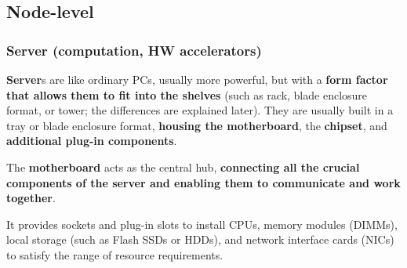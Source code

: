 \documentclass[a4paper]{article}
\newcommand{\definition}[1]{\textcolor{Red3}{\textbf{#1}}\index{#1}}
\newcommand{\highspace}{\vspace{1.2em}\noindent}
\begin{document}
    \newpage

    \subsection{Node-level}

    \subsubsection{Server (computation, HW accelerators)}\label{subsubsection: Server (computation, HW accelerators)}

    \definition{Server}s are like ordinary PCs, usually more powerful, but with a \textbf{form factor that allows them to fit into the shelves} (such as rack, blade enclosure format, or tower; the differences are explained later). They are usually built in a tray or blade enclosure format, \textbf{housing the motherboard}, the \textbf{chipset}, and \textbf{additional plug-in components}.

    \highspace
    The \textbf{motherboard} acts as the central hub, \textbf{connecting all the crucial components of the server and enabling them to communicate and work together}.
    
    It provides sockets and plug-in slots to install CPUs, memory modules (DIMMs), local storage (such as Flash SSDs or HDDs), and network interface cards (NICs) to satisfy the range of resource requirements.
\end{document}
